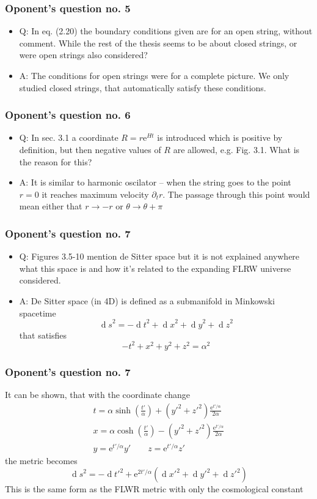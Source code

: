 \documentclass[11pt]{beamer}
\newcommand{\D}[1]{\ensuremath{\operatorname{d}\!{#1}}}
\newcommand{\difs}[3][]{\partial_{#3}^{#1}{#2}}
\newcommand{\me}{\mathrm{e}}
\newcommand{\lp}{\left(}
\newcommand{\rp}{\right)}
\begin{document}
\begin{frame}
\frametitle{Oponent's question no. 5}
\begin{itemize}
	\item Q: In eq. (2.20) the boundary conditions given are for an open string, without comment.
	While the rest of the thesis seems to be about closed strings, or were open strings
	also considered?
	\item A: The conditions for open strings were for a complete picture. We only studied closed strings, that automatically satisfy these conditions.
\end{itemize}
\end{frame}


\begin{frame}
\frametitle{Oponent's question no. 6}
\begin{itemize}
	\item Q: In sec. 3.1 a coordinate $R = r \me^{Ht}$ is introduced which is positive by definition, but
	then negative values of $R$ are allowed, e.g. Fig. 3.1. What is the reason for this?
	\item A: It is similar to harmonic oscilator -- when the string goes to the point $r = 0$ it reaches maximum velocity $\difs {r} {t}$. The passage through this point would mean either that $r \rightarrow -r$ or $\theta \rightarrow \theta + \pi$
\end{itemize}
\end{frame}


\begin{frame}
\frametitle{Oponent's question no. 7}
\begin{itemize}
	\item Q:  Figures 3.5-10 mention de Sitter space but it is not explained anywhere what this
	space is and how it’s related to the expanding FLRW universe considered.
	\item A: De Sitter space (in 4D) is defined as a submanifold in Minkowski spacetime
	$$
	\D s^2 = -\D t^2 + \D x^2 + \D y^2 + \D z^2
	$$
	that satisfies
	$$
	-t^2 + x^2 + y^2 + z^2 = \alpha^2
	$$
\end{itemize}
\end{frame}


\begin{frame}
\frametitle{Oponent's question no. 7}
	It can be shown, that with the coordinate change 
	$$
	\begin{gathered}
	t = \alpha \sinh \lp \frac{t'}{\alpha} \rp + (y'^2 + z'^2) \frac{\me^{t'/\alpha}}{2 \alpha} \\
	x = \alpha \cosh \lp \frac{t'}{\alpha} \rp - (y'^2 + z'^2) \frac{\me^{t'/\alpha}}{2 \alpha} \\
	y = \me^{t'/\alpha} y' \qquad z = \me^{t'/\alpha} z'
	\end{gathered}
	$$
	the metric becomes
	$$
	\D s^2 = -\D t'^2 + \me^{2t'/\alpha} \lp \D x'^2 + \D y'^2 + \D z'^2 \rp
	$$
	This is the same form as the FLWR metric with only the cosmological constant
\end{frame}
\end{document}
